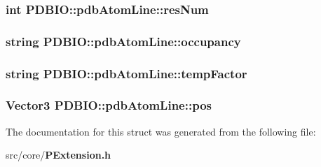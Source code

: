 \subsubsection{\setlength{\rightskip}{0pt plus 5cm}int {\bf PDBIO::pdb\-Atom\-Line::res\-Num}}\label{structPDBIO_1_1pdbAtomLine_a5f1d7ce58a6b4addb34bfe4c011bb73}


\subsubsection{\setlength{\rightskip}{0pt plus 5cm}string {\bf PDBIO::pdb\-Atom\-Line::occupancy}}\label{structPDBIO_1_1pdbAtomLine_5ee23d7350ac111a2273965b9a4a2014}


\subsubsection{\setlength{\rightskip}{0pt plus 5cm}string {\bf PDBIO::pdb\-Atom\-Line::temp\-Factor}}\label{structPDBIO_1_1pdbAtomLine_a054e5060464195f05ba48107662cbaa}


\subsubsection{\setlength{\rightskip}{0pt plus 5cm}Vector3 {\bf PDBIO::pdb\-Atom\-Line::pos}}\label{structPDBIO_1_1pdbAtomLine_5bd1ea4a42330dcb5c3e00b4c1c0d7af}




The documentation for this struct was generated from the following file:\begin{CompactItemize}
\item 
src/core/{\bf PExtension.h}\end{CompactItemize}
